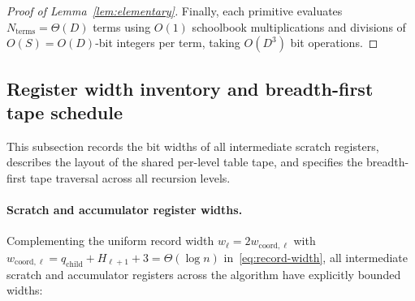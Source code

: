 \begin{proof}[Proof of Lemma~\ref{lem:elementary}]
Finally, each primitive evaluates $N_{\mathrm{terms}} = \Theta(D)$ terms using $O(1)$ schoolbook multiplications and divisions of $O(S) = O(D)$-bit integers per term, taking $O(D^3)$ bit operations.
\end{proof}

\subsection{Register width inventory and breadth-first tape schedule}\label{app:tape-schedule}

This subsection records the bit widths of all intermediate scratch registers, describes the layout of the shared per-level table tape, and specifies the breadth-first tape traversal across all recursion levels.

\paragraph{Scratch and accumulator register widths.}
Complementing the uniform record width $w_\ell = 2 w_{\mathrm{coord},\ell}$ with $w_{\mathrm{coord},\ell} = q_{\mathrm{child}} + H_{\ell+1} + 3 = \Theta(\log n)$ in~\eqref{eq:record-width}, all intermediate scratch and accumulator registers across the algorithm have explicitly bounded widths:

